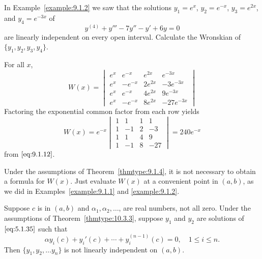 \documentclass{ximera}
\begin{document}
\begin{example}\label{example:9.1.4} In
Example~\ref{example:9.1.2} we saw that the solutions $y_1=e^x$,
$y_2=e^{-x}$,
$y_3=e^{2x}$, and $y_4=e^{-3x}$ of
$$
y^{(4)}+y'''-7y''-y'+6y=0
$$
are linearly independent on every open interval.
Calculate the Wronskian  of $\{y_1,y_2,y_3,y_4\}$.

\begin{explanation}
For all $x$,
$$
W(x)=\begin{vmatrix}
e^x&e^{-x}&e^{2x}&e^{-3x}\\
e^x&-e^{-x}&2e^{2x}&-3e^{-3x}\\
e^x&e^{-x}&4e^{2x}&9e^{-3x}\\
e^x&-e^{-x}&8e^{2x}&-27e^{-3x}
\end{vmatrix}
$$
Factoring the exponential common factor from each row yields
$$
W(x)=e^{-x}\begin{vmatrix}1&1&1&1\\1&-1&2&-3\\1&1&4&9\\
1&-1&8&-27\end{vmatrix}=240e^{-x}
$$
from $\eqref{eq:9.1.12}$.
\end{explanation}
\end{example}

\begin{remark}
Under the assumptions of Theorem~\ref{thmtype:9.1.4}, it is not necessary to obtain a formula for $W(x)$. Just evaluate $W(x)$
at a convenient point in $(a,b)$, as we did in
Examples~\ref{example:9.1.1} and \ref{example:9.1.2}.
\end{remark}



\begin{theorem}\label{thmtype:9.1.5}
Suppose $c$ is in $(a,b)$ and $\alpha_{1}, \alpha_{2}, \dots$,
are real numbers, not all zero.
Under the assumptions of Theorem~\ref{thmtype:10.3.3}, suppose
$y_{1}$ and $y_{2}$ are  solutions  of $\eqref{eq:5.1.35}$ such that
\begin{equation} \label{eq:9.1.16}
\alpha y_{i}(c)+ y_{i}'(c)+\cdots +y_{i}^{(n-1)}(c)=0,\quad 1\leq i\leq n.
\end{equation}
Then $\{y_{1},y_{2},\dots y_{n}\}$ is not linearly independent on $(a,b).$
\end{theorem}
\end{document}
